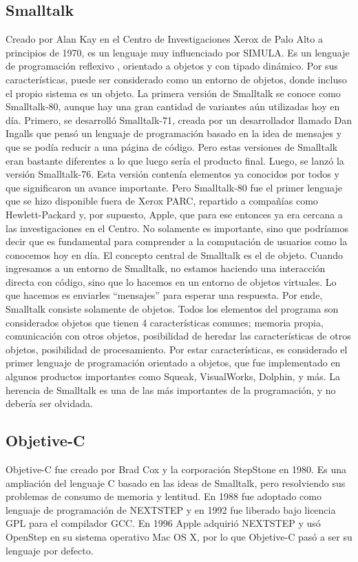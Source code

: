 \documentclass[twoside,twocolumn]{article}
\begin{document}
\subsection{Smalltalk}
Creado por Alan Kay en el Centro de Investigaciones Xerox de Palo Alto a principios de 1970, es un lenguaje muy influenciado por SIMULA. Es un lenguaje de programación reflexivo , orientado a objetos y con tipado dinámico. Por sus características, puede ser considerado como un entorno de objetos, donde incluso el propio sistema es un objeto. La primera versión de Smalltalk se conoce como Smalltalk-80, aunque hay una gran cantidad de variantes aún utilizadas hoy en día. Primero, se desarrolló Smalltalk-71, creada por un desarrollador llamado Dan Ingalls que pensó un lenguaje de programación basado en la idea de mensajes y que se podía reducir a una página de código. Pero estas versiones de Smalltalk eran bastante diferentes a lo que luego sería el producto final. Luego, se lanzó la versión Smalltalk-76. Esta versión contenía elementos ya conocidos por todos y que significaron un avance importante. Pero Smalltalk-80 fue el primer lenguaje que se hizo disponible fuera de Xerox PARC, repartido a compañías como Hewlett-Packard y, por supuesto, Apple, que para ese entonces ya era cercana a las investigaciones en el Centro. No solamente es importante, sino que podríamos decir que es fundamental para comprender a la computación de usuarios como la conocemos hoy en día. El concepto central de Smalltalk es el de objeto. Cuando ingresamos a un entorno de Smalltalk, no estamos haciendo una interacción directa con código, sino que lo hacemos en un entorno de objetos virtuales. Lo que hacemos es enviarles “mensajes” para esperar una respuesta. Por ende, Smalltalk consiste solamente de objetos. Todos los elementos del programa son considerados objetos que tienen 4 características comunes; memoria propia, comunicación con otros objetos, posibilidad de heredar las características de otros objetos, posibilidad de procesamiento. Por estar características, es considerado el primer lenguaje de programación orientado a objetos, que fue implementado en algunos productos importantes como Squeak, VisualWorks, Dolphin, y más. La herencia de Smalltalk es una de las más importantes de la programación, y no debería ser olvidada.

\subsection{Objetive-C}
Objetive-C fue creado por Brad Cox y la corporación StepStone en 1980. Es una ampliación del lenguaje C basado en las ideas de Smalltalk, pero resolviendo sus problemas de consumo de memoria y lentitud. En 1988 fue adoptado como lenguaje de programación de NEXTSTEP y en 1992 fue liberado bajo licencia GPL para el compilador GCC. En 1996 Apple adquirió NEXTSTEP y usó OpenStep en su sistema operativo Mac OS X, por lo que Objetive-C pasó a ser su lenguaje por defecto.
\end{document}
